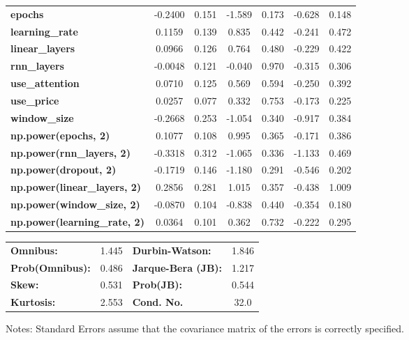 \begin{center}
\begin{tabular}{lcccccc}
\textbf{epochs}                            &      -0.2400  &        0.151     &    -1.589  &         0.173        &       -0.628    &        0.148     \\
\textbf{learning\_rate}                    &       0.1159  &        0.139     &     0.835  &         0.442        &       -0.241    &        0.472     \\
\textbf{linear\_layers}                    &       0.0966  &        0.126     &     0.764  &         0.480        &       -0.229    &        0.422     \\
\textbf{rnn\_layers}                       &      -0.0048  &        0.121     &    -0.040  &         0.970        &       -0.315    &        0.306     \\
\textbf{use\_attention}                    &       0.0710  &        0.125     &     0.569  &         0.594        &       -0.250    &        0.392     \\
\textbf{use\_price}                        &       0.0257  &        0.077     &     0.332  &         0.753        &       -0.173    &        0.225     \\
\textbf{window\_size}                      &      -0.2668  &        0.253     &    -1.054  &         0.340        &       -0.917    &        0.384     \\
\textbf{np.power(epochs, 2)}               &       0.1077  &        0.108     &     0.995  &         0.365        &       -0.171    &        0.386     \\
\textbf{np.power(rnn\_layers, 2)}          &      -0.3318  &        0.312     &    -1.065  &         0.336        &       -1.133    &        0.469     \\
\textbf{np.power(dropout, 2)}              &      -0.1719  &        0.146     &    -1.180  &         0.291        &       -0.546    &        0.202     \\
\textbf{np.power(linear\_layers, 2)}       &       0.2856  &        0.281     &     1.015  &         0.357        &       -0.438    &        1.009     \\
\textbf{np.power(window\_size, 2)}         &      -0.0870  &        0.104     &    -0.838  &         0.440        &       -0.354    &        0.180     \\
\textbf{np.power(learning\_rate, 2)}       &       0.0364  &        0.101     &     0.362  &         0.732        &       -0.222    &        0.295     \\
\bottomrule
\end{tabular}
\begin{tabular}{lclc}
\textbf{Omnibus:}       &  1.445 & \textbf{  Durbin-Watson:     } &    1.846  \\
\textbf{Prob(Omnibus):} &  0.486 & \textbf{  Jarque-Bera (JB):  } &    1.217  \\
\textbf{Skew:}          &  0.531 & \textbf{  Prob(JB):          } &    0.544  \\
\textbf{Kurtosis:}      &  2.553 & \textbf{  Cond. No.          } &     32.0  \\
\bottomrule
\end{tabular}
\end{center}

Notes: \newline
 [1] Standard Errors assume that the covariance matrix of the errors is correctly specified.
